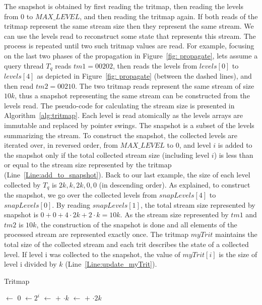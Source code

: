 The snapshot is obtained by first reading the tritmap, then reading the levels from $0$ to $MAX\_LEVEL$, and then reading the tritmap again. If both reads of the tritmap represent the same stream size then they represent the same stream. We can use the levels read to reconstruct some state that represents this stream. The process is repeated until two such tritmap values are read. For example, focusing on the last two phases of the propagation in Figure~\ref{fig: propagate}, lets assume a query thread $T_q$ reads $tm1=00202$, then reads the levels from $\mathit{levels[0]}$ to $\mathit{levels[4]}$ as depicted in Figure~\ref{fig: propagate} (between the dashed lines), and then read $tm2=00210$. The two tritmap reads represent the same stream of size $10k$, thus a snapshot representing the same stream can be constructed from the levels read. The pseudo-code for calculating the stream size is presented in Algorithm~\ref{alg:tritmap}. Each level is read atomically as the levels arrays are immutable and replaced by pointer swings. The snapshot is a subset of the levels summarizing the stream. To construct the snapshot, the collected levels are iterated over, in reversed order, from $\mathit{MAX\_LEVEL}$ to $0$, and level $i$ is added to the snapshot only if the total collected stream size (including level $i$) is less than or equal to the stream size represented by the tritmap (Line~\ref{Line:add_to_snapshot}). Back to our last example, the size of each level collected by $T_q$ is ${2k,k,2k,0,0}$ (in descending order). As explained, to construct the snapshot, we go over the collected levels from $\mathit{snapLevels[4]}$ to $\mathit{snapLevels[0]}$. By reading $snapLevels[1]$, the total stream size represented by snapshot is $0+0+4\cdot2k+2\cdot k = 10k$. As the stream size represented by $tm1$ and $tm2$ is $10k$, the construction of the snapshot is done and all elements of the processed stream are represented exactly once. The tritmap $\mathit{myTrit}$ maintains the total size of the collected stream and each trit describes the state of a collected level. If level i was collected to the snapshot, the value of $\mathit{myTrit[i]}$ is the size of level i divided by $k$ (Line~\ref{Line:update_myTrit}). 

 
\begin{algorithm}[h]
\caption{Tritmap} \label{alg:tritmap}
\begin{algorithmic}
\setcounter{ALG@line}{\value{mycounter}}
        \State {} $\gets$ 0
            \State {} $\gets 2^i $
                \State {} $\gets$  $+$ $\cdot k$
                     \State {} $\gets$  $+$ $\cdot 2k$
            \EndIf
        \EndFor
        \State {}
\EndProcedure
\setcounter{mycounter}{\value{ALG@line}}
\end{algorithmic}
\end{algorithm}
 
